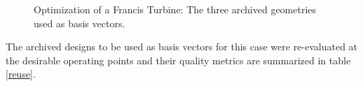 \begin{figure}[h!]
\begin{minipage}[b]{1\linewidth}
 \centering
\end{minipage}
\caption{Optimization of a Francis Turbine: The three archived geometries used as basis vectors.}
\label{design-bases}
\end{figure}

The archived designs to be used as basis vectors for this case were re-evaluated at the desirable operating points and their quality metrics are summarized in table \ref{reuse}.

